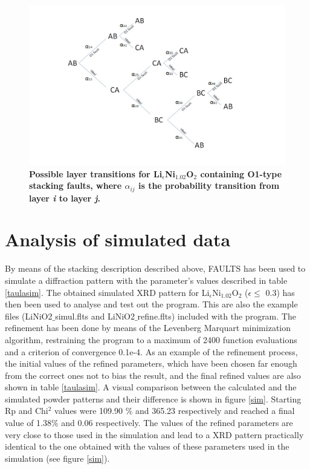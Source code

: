 \begin{figure}[t]
\begin{center}
\includegraphics [width=5.2 in]{transitions.jpg}
\caption{\bf Possible layer transitions for Li$_{\epsilon}$Ni$_{1.02}$O$_{2}$ containing O1-type stacking faults, where $\alpha_{ij}$ is the probability transition from layer \emph{i} to layer \emph{j}.}
\label{capes}
\end{center}
\end{figure}





\section{Analysis of simulated data}
\label{Analysis of simulated data}

By  means of the  stacking description described above, FAULTS has been used to simulate a diffraction pattern with the parameter's values described in table \ref{taulasim}.
The obtained simulated XRD pattern for Li$_{\epsilon}$Ni$_{1.02}$O$_{2}$ ($\epsilon\leq$ 0.3) has then been used to analyse and test out the program. This are also the example files (LiNiO2$\_$simul.flts and LiNiO2$\_$refine.flts) included with the program. The refinement has been done by means of the Levenberg Marquart minimization algorithm, restraining the program to a maximum of 2400 function evaluations and a criterion of convergence 0.1e-4. As an example of the refinement process, the initial values of the refined parameters, which have been chosen far enough from the correct ones not to bias the result,
and  the final refined values are also  shown in table \ref{taulasim}.
A visual comparison between the calculated and the simulated powder patterns and their difference is shown in figure \ref{sim}.
Starting Rp and Chi$^{2}$ values were 109.90 $\%$  and 365.23 respectively and reached a final value of 1.38$\%$ and 0.06 respectively.
The values of the refined parameters are very close to those used in the simulation and lead to a XRD pattern practically
identical to the one obtained with the values of these parameters used in the simulation (see figure \ref{sim}).



